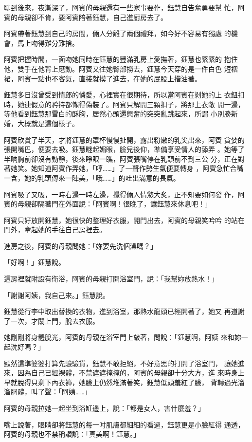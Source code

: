 聊到後來，夜漸深了，阿賓的母親還有一些家事要作，鈺慧自告奮勇要幫
忙，阿賓的母親卻不肯，要阿賓陪著鈺慧，自己進廚房去了。

阿賓帶著鈺慧到自己的房間，倆人分離了兩個禮拜，如今好不容易有獨處
的機會，馬上吻得難分難捨。

阿賓把握時間，一面吻她同時在鈺慧的豐滿乳房上愛撫著，鈺慧也緊緊的
抱住他，雙手在他背上磨動。阿賓又往她臀部撈去，鈺慧今天穿的是一件白色
短褶裙，阿賓一點也不客氣，直接就摸了進去，在她的屁股上揩油著。

鈺慧多日沒曾受到情郎的憐愛，心裡實在很期待，所以當阿賓在剝她的上
衣鈕扣時，她連假意的矜持都懶得偽裝了。阿賓只解開三顆扣子，將那上衣敞
開一邊，等他看到鈺慧那雪白的酥胸，居然心頭還興奮的突突亂跳起來，所謂
小別勝新婚，大概就是這個樣子。

阿賓欣賞了半天，才將鈺慧的罩杯慢慢扯開，露出粉嫩的乳尖出來，阿賓
貪婪的張開嘴巴，便要去吸。鈺慧瞇起媚眼，臉兒後仰，準備享受情人的舔弄
。她等了半晌胸前卻沒有動靜，後來睜眼一瞧，阿賓張嘴停在乳頭前不到三公
分，正在對著她笑。她知道阿賓作弄她，「哼……」了一聲作勢生氣便要轉身
，阿賓急忙合嘴一含，她的乳頭傳來一陣美，「哦……」的吐出滿意的長氣。

阿賓吸了又吸，一時右邊一時左邊，攪得倆人情慾大炙，正不知要如何發
作，阿賓的母親卻隔著門在外面說：「阿賓啊！很晚了，讓鈺慧來休息吧！」

阿賓只好放開鈺慧，她很快的整理好衣服，開門出去，阿賓的母親笑吟吟
的站在門外，牽起她的手往自己房裡去。

進房之後，阿賓的母親問她：「妳要先洗個澡嗎？」

「好啊！」鈺慧說。

這房裡就附設有衛浴，阿賓的母親打開浴室門，說：「我幫妳放熱水！」

「謝謝阿姨，我自己來。」鈺慧說。

鈺慧從行李中取出替換的衣物，進到浴室，那熱水龍頭已經開著了，她又
再道謝了一次，才關上門，脫去衣服。

她剛剛將身體脫光，阿賓的母親在浴室門上敲著，問說：「鈺慧啊，阿姨
來和妳一起洗好嗎？」

顯然這準婆婆打算先驗驗貨，鈺慧不敢拒絕，不好意思的打開了浴室門，
讓她進來，因為自己已經裸體，不禁遮遮掩掩的，阿賓的母親卻十分大方，進
來時身上早就脫得只剩下內衣褲，她臉上仍然堆滿著笑，鈺慧低頭羞紅了臉，
背轉過光溜溜胴體，叫了聲：「阿姨……」

阿賓的母親拉她一起坐到浴缸邊上，說：「都是女人，害什麼羞？」

嘴上說著，眼睛卻將鈺慧的每一吋肌膚都細細的看過，鈺慧更是小臉紅得
通透，阿賓的母親也不禁稱讚說：「真美啊！鈺慧。」

